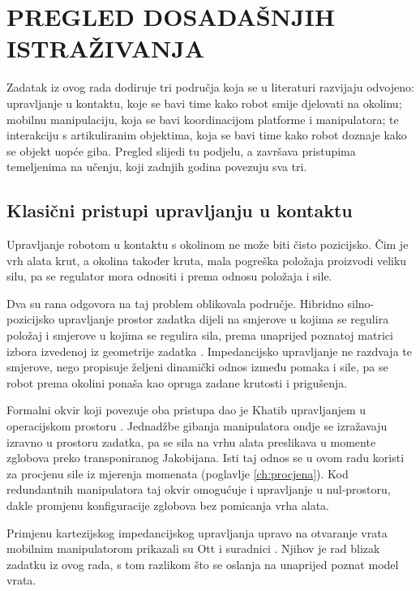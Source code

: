 \chapter{PREGLED DOSADAŠNJIH ISTRAŽIVANJA}
\label{ch:pregled}

Zadatak iz ovog rada dodiruje tri područja koja se u literaturi razvijaju odvojeno: upravljanje
u kontaktu, koje se bavi time kako robot smije djelovati na okolinu; mobilnu manipulaciju, koja
se bavi koordinacijom platforme i manipulatora; te interakciju s artikuliranim objektima, koja
se bavi time kako robot doznaje kako se objekt uopće giba. Pregled slijedi tu podjelu, a
završava pristupima temeljenima na učenju, koji zadnjih godina povezuju sva tri.

\section{Klasični pristupi upravljanju u kontaktu}
\label{sec:pregled-klasicni}

Upravljanje robotom u kontaktu s okolinom ne može biti čisto pozicijsko. Čim je vrh alata krut,
a okolina također kruta, mala pogreška položaja proizvodi veliku silu, pa se regulator mora
odnositi i prema odnosu položaja i sile.

Dva su rana odgovora na taj problem oblikovala područje. Hibridno silno-pozicijsko upravljanje
prostor zadatka dijeli na smjerove u kojima se regulira položaj i smjerove u kojima se regulira
sila, prema unaprijed poznatoj matrici izbora izvedenoj iz geometrije zadatka
\cite{raibert1981hybrid}. Impedancijsko upravljanje ne razdvaja te smjerove, nego propisuje
željeni dinamički odnos između pomaka i sile, pa se robot prema okolini ponaša kao opruga
zadane krutosti i prigušenja.

Formalni okvir koji povezuje oba pristupa dao je Khatib upravljanjem u operacijskom prostoru
\cite{khatib1987operational}. Jednadžbe gibanja manipulatora ondje se izražavaju izravno u
prostoru zadatka, pa se sila na vrhu alata preslikava u momente zglobova preko transponiranog
Jakobijana. Isti taj odnos se u ovom radu koristi za procjenu sile iz mjerenja momenata
(poglavlje \ref{ch:procjena}). Kod redundantnih manipulatora taj okvir omogućuje i upravljanje
u nul-prostoru, dakle promjenu konfiguracije zglobova bez pomicanja vrha alata.

Primjenu kartezijskog impedancijskog upravljanja upravo na otvaranje vrata mobilnim
manipulatorom prikazali su Ott i suradnici \cite{ott2005door}. Njihov je rad blizak zadatku iz
ovog rada, s tom razlikom što se oslanja na unaprijed poznat model vrata.

